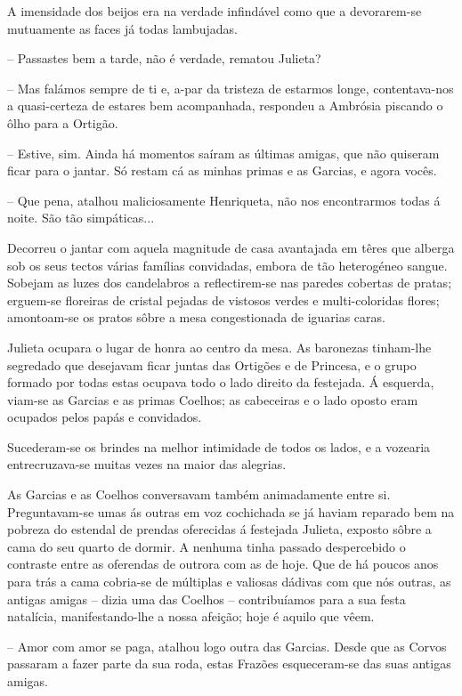 \documentclass[9pt]{article}
\begin{document}
A imensidade dos beijos era na verdade infindável como que a devo\-rarem-se mutuamente as faces já todas lambujadas.

-- Passastes bem a tarde, não é verdade, rematou Julieta?

-- Mas falámos sempre de ti e, a-par da tristeza de estarmos longe,
contentava-nos a quasi-certeza de estares bem acompanhada, respondeu a
Ambrósia piscando o ô\-lho para a Ortigão.

-- Estive, sim. Ainda há momentos saíram as últimas amigas, que não
quiseram fi\-car para o jantar. Só restam cá as minhas primas e as Garcias,
e agora vocês.

-- Que pena, ata\-lhou maliciosamente Henriqueta, não nos encontrarmos
todas á noite. São tão simpáticas...

Decorreu o jantar com aquela magnitude de casa avantajada em têres
que alberga sob os seus tectos várias fa\-mí\-lias convidadas, embora de tão
heterogéneo sangue. Sobejam as luzes dos candelabros a reflectirem-se
nas paredes cobertas de pratas; erguem-se floreiras de cristal pejadas
de vistosos verdes e multi-coloridas flores; amon\-\mbox{toam-se} os pratos sôbre
a mesa congestionada de iguarias caras.

Julieta ocupara o lugar de honra ao centro da mesa. As baronezas
tinham-\-lhe segredado que desejavam fi\-car juntas das Ortigões e de Princesa, e o grupo formado por todas estas ocupava todo o lado direito da
festejada. Á esquerda, viam-se as Garcias e as primas Coe\-lhos; as cabeceiras e o lado oposto eram ocupados pelos papás e convidados.

Sucederam-se os brindes na me\-lhor intimidade de todos os lados, e a
vozearia entrecruzava-se muitas vezes na maior das alegrias.

As Garcias e as Coe\-lhos conversavam também animadamente entre si.
Preguntavam-se umas ás outras em voz cochichada se já haviam reparado
bem na pobreza do estendal de prendas oferecidas á festejada Julieta,
exposto sôbre a cama do seu quarto de dormir. A nenhuma tinha passado
despercebido o contraste entre as oferendas de outrora com as de hoje.
Que de há poucos anos para trás a cama cobria-se de múltiplas e valiosas
dádivas com que nós outras, as antigas amigas -- dizia uma das Coe\-lhos --
contribuíamos para a sua festa natalícia, manifestando-\-lhe a nossa afei\-ção; hoje é aquilo que vêem.

-- Amor com amor se paga, ata\-lhou logo outra das Garcias. Desde que
as Corvos passaram a fazer parte da sua roda, estas Frazões esque\-ceram-se
das suas antigas amigas.
\end{document}
